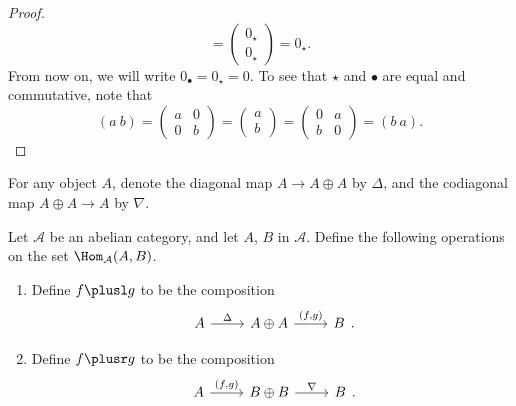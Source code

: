 \documentclass[main.tex]{subfiles}
\begin{document}
\begin{proof}
\begin{equation*}
    =
    \begin{pmatrix}
      0_{\star}
      \\
      0_{\star}
    \end{pmatrix}
    = 0_{\star}.
  \end{equation*}
  From now on, we will write $0_{\bullet} = 0_{\star} = 0$. To see that $\star$ and $\bullet$ are equal and commutative, note that
  \begin{equation*}
    (a\ b) =
    \begin{pmatrix}
      a & 0 \\
      0 & b
    \end{pmatrix}
    =
    \begin{pmatrix}
      a \\ b
    \end{pmatrix}
    =
    \begin{pmatrix}
      0 & a \\
      b & 0
    \end{pmatrix}
    = (b\ a).
  \end{equation*}
\end{proof}

For any object $A$, denote the diagonal map $A \to A \oplus A$ by $\Delta$, and the codiagonal map $A \oplus A \to A$ by $\nabla$.

\begin{definition}
  Let $\mathcal{A}$ be an abelian category, and let $A$, $B$ in $\mathcal{A}$. Define the following operations on the set $\Hom_{\mathcal{A}}(A, B)$.
  \begin{enumerate}
    \item Define $f \plusl g$ to be the composition
      \begin{equation*}
        \begin{tikzcd}
          A
          \arrow[r, "\Delta"]
          & A \oplus A
          \arrow[r, "{(f, g)}"]
          & B
        \end{tikzcd}.
      \end{equation*}

    \item Define $f \plusr g$ to be the composition
      \begin{equation*}
        \begin{tikzcd}
          A
          \arrow[r, "{(f, g)}"]
          & B \oplus B
          \arrow[r, "\nabla"]
          & B
        \end{tikzcd}.
      \end{equation*}
  \end{enumerate}
\end{definition}
\end{document}
